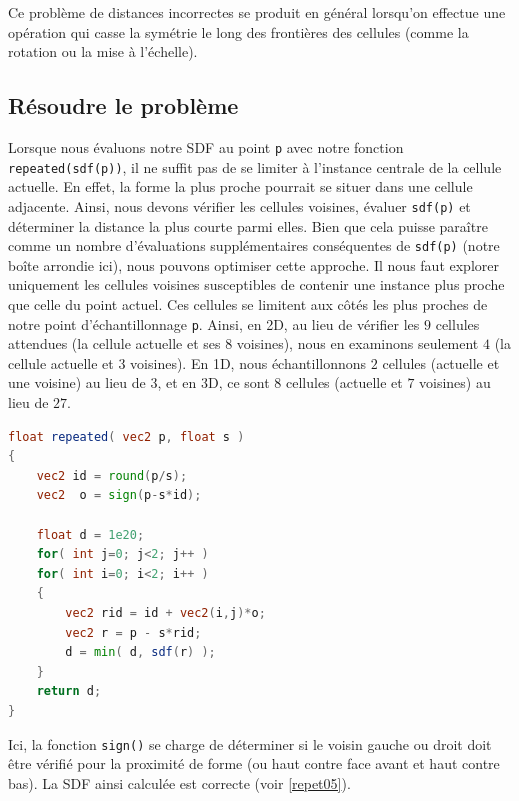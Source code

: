 Ce problème de distances incorrectes se produit en général lorsqu'on effectue une opération qui casse la symétrie le long des frontières des cellules (comme la rotation ou la mise à l'échelle). 

\subsection*{Résoudre le problème}


Lorsque nous évaluons notre SDF au point \lstinline{p} avec notre fonction \lstinline{repeated(sdf(p))}, il ne suffit pas de se limiter à l'instance centrale de la cellule actuelle. En effet, la forme la plus proche pourrait se situer dans une cellule adjacente. Ainsi, nous devons vérifier les cellules voisines, évaluer \lstinline{sdf(p)} et déterminer la distance la plus courte parmi elles. Bien que cela puisse paraître comme un nombre d'évaluations supplémentaires conséquentes de \lstinline{sdf(p)} (notre boîte arrondie ici), nous pouvons optimiser cette approche. Il nous faut explorer uniquement les cellules voisines susceptibles de contenir une instance plus proche que celle du point actuel. Ces cellules se limitent aux côtés les plus proches de notre point d'échantillonnage \lstinline{p}. Ainsi, en 2D, au lieu de vérifier les $9$ cellules attendues (la cellule actuelle et ses $8$ voisines), nous en examinons seulement $4$ (la cellule actuelle et $3$ voisines). En 1D, nous échantillonnons $2$ cellules (actuelle et une voisine) au lieu de $3$, et en 3D, ce sont $8$ cellules (actuelle et $7$ voisines) au lieu de $27$.

\begin{minipage}{\linewidth}
\begin{lstlisting}[language=GLSL, caption=Résoudre le problème,captionpos=b,frame=single]
float repeated( vec2 p, float s )
{
    vec2 id = round(p/s);
    vec2  o = sign(p-s*id);
    
    float d = 1e20;
    for( int j=0; j<2; j++ )
    for( int i=0; i<2; i++ )
    {
        vec2 rid = id + vec2(i,j)*o;
        vec2 r = p - s*rid;
        d = min( d, sdf(r) );
    }
    return d;
}
\end{lstlisting}
\end{minipage}


Ici, la fonction \lstinline{sign()} se charge de déterminer si le voisin gauche ou droit doit être vérifié pour la proximité de forme (ou haut contre face avant et haut contre bas). La SDF ainsi calculée est correcte (voir \ref{repet05}).


